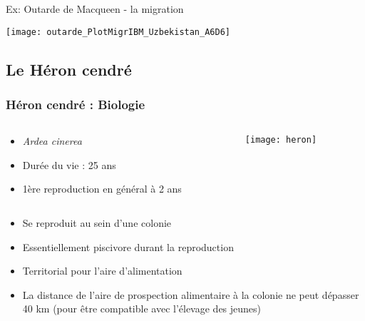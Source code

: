 \documentclass[]{beamer}
\begin{document}
\begin{frame}{Ex: Outarde de Macqueen - la migration}
  \begin{center}
    \texttt{[image: outarde\_PlotMigrIBM\_Uzbekistan\_A6D6]}
  \end{center}
\end{frame}



\subsection{Le Héron cendré}

\begin{frame}
  \frametitle{Héron cendré : Biologie}
  \begin{columns}
    \begin{column}[c]{0.5\textwidth}
      \begin{itemize}
      \item \textit{Ardea cinerea} 
      \item Durée du vie : 25 ans 
      \item 1ère reproduction en général à 2 ans
      \end{itemize}

    \end{column}
    \begin{column}[l]{0.5\textwidth}
      \begin{center}
        \texttt{[image: heron]} 
      \end{center}
    \end{column}
  \end{columns}
  
  
  
  \begin{itemize}

  \item Se reproduit au sein d’une colonie
  \item Essentiellement piscivore durant la reproduction
  \item Territorial pour l'aire d'alimentation
  \item La distance de l’aire de prospection alimentaire à la colonie ne peut dépasser 40 km (pour être compatible avec l’élevage des jeunes)
  \end{itemize}
\end{frame}
\end{document}
